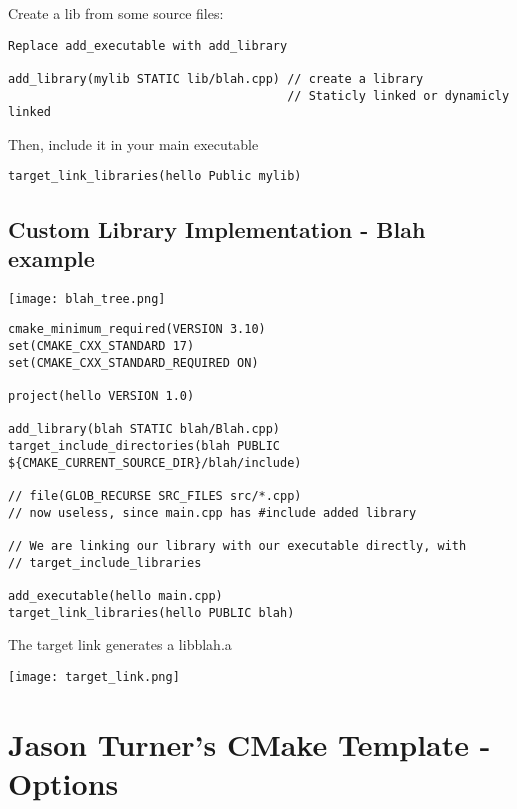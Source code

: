 Create a lib from some source files:

\begin{verbatim}
Replace add_executable with add_library

add_library(mylib STATIC lib/blah.cpp) // create a library
                                       // Staticly linked or dynamicly linked
\end{verbatim}

Then, include it in your main executable
\begin{verbatim}
target_link_libraries(hello Public mylib)
\end{verbatim}

\subsection{Custom Library Implementation - Blah example}

\begin{center}
    \texttt{[image: blah\_tree.png]}
\end{center}

\begin{verbatim}
cmake_minimum_required(VERSION 3.10)
set(CMAKE_CXX_STANDARD 17)
set(CMAKE_CXX_STANDARD_REQUIRED ON)

project(hello VERSION 1.0)

add_library(blah STATIC blah/Blah.cpp)
target_include_directories(blah PUBLIC ${CMAKE_CURRENT_SOURCE_DIR}/blah/include)

// file(GLOB_RECURSE SRC_FILES src/*.cpp)
// now useless, since main.cpp has #include added library

// We are linking our library with our executable directly, with
// target_include_libraries

add_executable(hello main.cpp)
target_link_libraries(hello PUBLIC blah)
\end{verbatim}

The target link generates a libblah.a

\begin{center}
    \texttt{[image: target\_link.png]}
\end{center}

\section{Jason Turner's CMake Template - Options}


